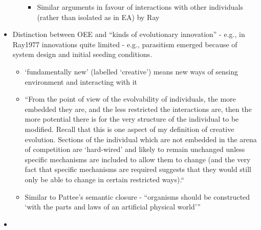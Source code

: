 \begin{itemize}
\begin{itemize}
	      	      		
	      	      \begin{itemize}
	      	      	\item
	      	      	      			
	      	      	      Similar arguments in favour of interactions with other individuals
	      	      	      (rather than isolated as in EA) by Ray
	      	      	      			
	      	      \end{itemize}
	      \end{itemize}
	\item
	      	
	      Distinction between OEE and ``kinds of evolutionary innovation'' -
	      e.g., in Ray1977 innovations quite limited - e.g., parasitism emerged
	      because of system design and initial seeding conditions.
	      	
	      	
	      \begin{itemize}
	      	\item
	      	      		
	      	      `fundamentally new' (labelled `creative') means new ways of sensing
	      	      environment and interacting with it
	      	      		
	      	\item
	      	      		
	      	      ``From the point of view of the evolvability of individuals, the
	      	      more embedded they are, and the less restricted the interactions
	      	      are, then the more potential there is for the very structure of the
	      	      individual to be modified. Recall that this is one aspect of my
	      	      definition of creative evolution. Sections of the individual which
	      	      are not embedded in the arena of competition are `hard-wired' and
	      	      likely to remain unchanged unless specific mechanisms are included
	      	      to allow them to change (and the very fact that specific mechanisms
	      	      are required suggests that they would still only be able to change
	      	      in certain restricted ways).``
	      	      		
	      	\item
	      	      		
	      	      Similar to Pattee's semantic closure - ``organisms should be
	      	      constructed `with the parts and laws of an artificial physical
	      	      world'''
	      	      		
	      \end{itemize}
	\item
	      	

\end{itemize}
